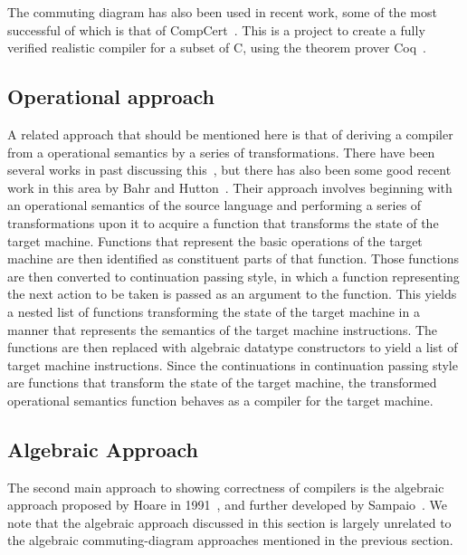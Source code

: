 \documentclass[a4paper,10pt]{report}
\begin{document}
The commuting diagram has also been used in recent work, some of the
most successful of which is that of CompCert~\cite{leroy2009a,
  leroy2009b, leroy2012}.
This is a project to create a fully verified realistic compiler for a
subset of C, using the theorem prover Coq~\cite{coq2004}.

\subsection{Operational approach}
\label{operational-approach-subsection}

A related approach that should be mentioned here is that of deriving a
compiler from a operational semantics by a series of transformations.
There have been several works in past discussing this~\cite{wand1982,
  meijer1992a, ager2003}, but there has also been some good recent
work in this area by Bahr and Hutton~\cite{bahr2015}.
Their approach involves beginning with an operational semantics of the
source language and performing a series of transformations upon it to
acquire a function that transforms the state of the target machine.
Functions that represent the basic operations of the target machine
are then identified as constituent parts of that function.
Those functions are then converted to continuation passing style, in
which a function representing the next action to be taken is passed as
an argument to the function.
This yields a nested list of functions transforming the state of the
target machine in a manner that represents the semantics of the target
machine instructions.
The functions are then replaced with algebraic datatype constructors
to yield a list of target machine instructions.
Since the continuations in continuation passing style are functions
that transform the state of the target machine, the transformed
operational semantics function behaves as a compiler for the target
machine.

 

\subsection{Algebraic Approach}
\label{algebraic-approach-subsection}

The second main approach to showing correctness of compilers is the
algebraic approach proposed by Hoare in 1991~\cite{hoare1991}, and
further developed by Sampaio~\cite{hoare1993, sampaio1993,
  sampaio1997}.
We note that the algebraic approach discussed in this section is
largely unrelated to the algebraic commuting-diagram approaches
mentioned in the previous section.
\end{document}

